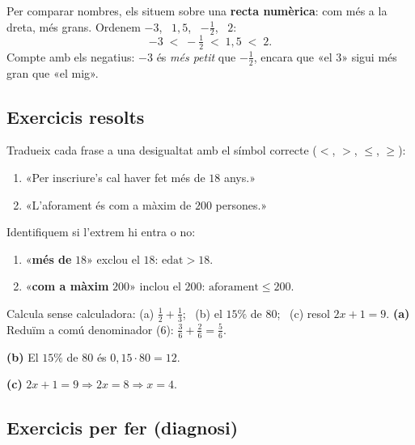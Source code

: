 \begin{exemple}
Per comparar nombres, els situem sobre una \textbf{recta numèrica}: com més a la
dreta, més grans. Ordenem $-3$, \ $1,5$, \ $-\tfrac{1}{2}$, \ $2$:
\[
-3 \;<\; -\tfrac{1}{2} \;<\; 1,5 \;<\; 2.
\]
Compte amb els negatius: $-3$ és \emph{més petit} que $-\tfrac{1}{2}$, encara que «el
$3$» sigui més gran que «el mig».
\end{exemple}

\subsection{Exercicis resolts}

\begin{exresolt}
Tradueix cada frase a una desigualtat amb el símbol correcte ($<$, $>$, $\le$, $\ge$):
\begin{enumerate}[label=\alph*), leftmargin=1.6em]
  \item «Per inscriure's cal haver fet més de $18$ anys.»
  \item «L'aforament és com a màxim de $200$ persones.»
\end{enumerate}
\solucio
Identifiquem si l'extrem hi entra o no:
\begin{enumerate}[label=\alph*), leftmargin=1.6em]
  \item «\textbf{més de} $18$» exclou el $18$: $\text{edat}>18$.
  \item «\textbf{com a màxim} $200$» inclou el $200$: $\text{aforament}\le 200$.
\end{enumerate}
\end{exresolt}

\begin{exresolt}
Calcula sense calculadora: (a) $\tfrac{1}{2}+\tfrac{1}{3}$; \ (b) el $15\%$ de $80$;
\ (c) resol $2x+1=9$.
\solucio
\textbf{(a)} Reduïm a comú denominador ($6$): $\tfrac{3}{6}+\tfrac{2}{6}=\tfrac{5}{6}$.

\textbf{(b)} El $15\%$ de $80$ és $0,15\cdot 80=12$.

\textbf{(c)} $2x+1=9 \Rightarrow 2x=8 \Rightarrow x=4$.
\end{exresolt}

\subsection{Exercicis per fer (diagnosi)}

